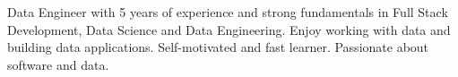 



\begin{cvparagraph}

Data Engineer with 5 years of experience and strong fundamentals in Full Stack Development, Data Science and Data Engineering. Enjoy working with data and building data applications. Self-motivated and fast learner. Passionate about software and data.
\end{cvparagraph}
